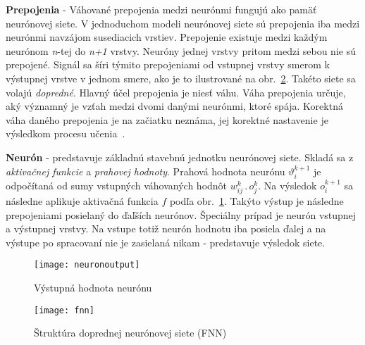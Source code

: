 \textbf{Prepojenia} - Váhované prepojenia medzi neurónmi fungujú ako pamäť neurónovej siete. V jednoduchom modeli neurónovej siete sú prepojenia iba medzi neurónmi navzájom susediacich vrstiev. Prepojenie existuje medzi každým neurónom \textit{n}-tej do \textit{n+1} vrstvy. Neuróny jednej vrstvy pritom medzi sebou nie sú prepojené. Signál sa šíri týmito prepojeniami od vstupnej vrstvy smerom k výstupnej vrstve v jednom smere, ako je to ilustrované na obr.~\ref{fig:fnn}. Takéto siete sa volajú \textit{dopredné}. Hlavný účel prepojenia je niesť váhu. Váha prepojenia určuje, aký významný je vzťah medzi dvomi danými neurónmi, ktoré spája. Korektná váha daného prepojenia je na začiatku neznáma, jej korektné nastavenie je výsledkom procesu učenia~\cite{Goodfellow-et-al-2016-Book}.
\noindent

\textbf{Neurón} - predstavuje základnú stavebnú jednotku neurónovej siete. Skladá sa z \textit{aktivačnej funkcie} a \textit{prahovej hodnoty}. Prahová hodnota neurónu $\vartheta _{i}^{k+1}$  je odpočítaná od sumy vstupných váhovaných hodnôt $ w_{ij}^{k}\, .\, o_{j}^{k}$. 
\newline
Na výsledok $o_{i}^{k+1}$ sa následne aplikuje aktivačná funkcia $f$ podľa obr.~\ref{fig:neuronoutput}. Takýto výstup je následne prepojeniami posielaný do ďaľších neurónov. Špeciálny prípad je neurón vstupnej a výstupnej vrstvy. Na vstupe totiž neurón hodnotu iba posiela ďalej a na výstupe po spracovaní nie je zasielaná nikam - predstavuje výsledok siete.
\newline





\begin{figure}[H]
\begin{center}\texttt{[image: neuronoutput]}\end{center}
\caption[neuronoutput]{Výstupná hodnota neurónu~\cite{kvasnivcka1997uvod}}\label{fig:neuronoutput}
\end{figure}

\noindent



\begin{figure}[H]
\begin{center}\texttt{[image: fnn]}\end{center}
\caption[fnn]{Štruktúra doprednej neurónovej siete (FNN)~\cite{jaeger2002tutorial}}\label{fig:fnn}
\end{figure}

